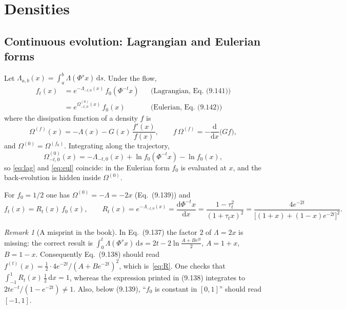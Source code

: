 \documentclass[11pt,a4paper]{article}
\theoremstyle{remark}
\newtheorem{remark}{Remark}
\newcommand{\dd}{\mathrm{d}}
\begin{document}
\section{Densities}

\subsection{Continuous evolution: Lagrangian and Eulerian forms}
Let $\Lambda_{a,b}(x)=\int_a^b\Lambda(\Phi^s x)\,\dd s$. Under the flow,
\begin{align}
  f_t(x) &= e^{-\Lambda_{-t,0}(x)}\, f_0(\Phi^{-t}x)
  && \text{(Lagrangian, Eq.~(9.141))} \label{eq:lag}\\
         &= e^{\Omega^{(0)}_{-t,0}(x)}\, f_0(x)
  && \text{(Eulerian, Eq.~(9.142))} \label{eq:eul}
\end{align}
where the dissipation function of a density $f$ is
\begin{equation}\label{eq:Omega}
  \Omega^{(f)}(x) = -\Lambda(x) - G(x)\,\frac{f'(x)}{f(x)},
  \qquad f\,\Omega^{(f)} = -\frac{\dd}{\dd x}\big(G f\big),
\end{equation}
and $\Omega^{(0)}=\Omega^{(f_0)}$. Integrating along the trajectory,
\begin{equation}
  \Omega^{(0)}_{-t,0}(x) = -\Lambda_{-t,0}(x) + \ln f_0(\Phi^{-t}x) - \ln f_0(x),
\end{equation}
so \eqref{eq:lag} and \eqref{eq:eul} coincide: in the Eulerian form $f_0$ is
evaluated at $x$, and the back-evolution is hidden inside $\Omega^{(0)}$.

For $f_0=1/2$ one has $\Omega^{(0)}=-\Lambda=-2x$ (Eq.~(9.139)) and
\begin{equation}\label{eq:R}
  f_t(x) = R_t(x)\,f_0(x),\qquad
  R_t(x) = e^{-\Lambda_{-t,0}(x)} = \frac{\dd\Phi^{-t}x}{\dd x}
  = \frac{1-\tau_t^2}{(1+\tau_t x)^2}
  = \frac{4e^{-2t}}{\big[(1+x)+(1-x)e^{-2t}\big]^2} .
\end{equation}

\begin{remark}[A misprint in the book]
In Eq.~(9.137) the factor $2$ of $\Lambda=2x$ is missing: the correct result is
$\int_0^t\Lambda(\Phi^s x)\,\dd s = 2t-2\ln\frac{A+Be^{2t}}{2}$, $A=1+x$,
$B=1-x$. Consequently Eq.~(9.138) should read
$f^{(t)}(x)=\frac12\cdot 4e^{-2t}/(A+Be^{-2t})^2$, which is~\eqref{eq:R}. One
checks that $\int_{-1}^1 R_t(x)\,\tfrac12\,\dd x=1$, whereas the expression
printed in (9.138) integrates to $2te^{-t}/(1-e^{-2t})\neq1$. Also, below
(9.139), ``$f_0$ is constant in $[0,1]$'' should read $[-1,1]$.
\end{remark}
\end{document}
